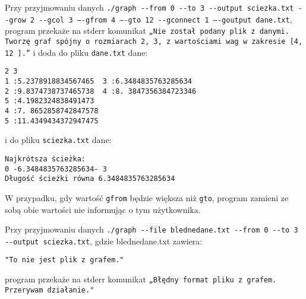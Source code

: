 \documentclass[]{article}
\begin{document}
\bigskip
\bigskip
Przy przyjmowaniu danych \texttt{./graph -{}-from 0 -{}-to 3 -{}-output sciezka.txt -{}-grow 2 -{}-gcol 3 –{}-gfrom 4 –{}-gto 12 -{}-gconnect 1 –{}-goutput dane.txt}, program przekaże na stderr komunikat \texttt{„Nie został podany plik z danymi. Tworzę graf spójny o rozmiarach 2, 3, z wartościami wag w zakresie [4, 12 ].”} i doda do pliku \texttt{dane.txt} dane:
\begin{verbatim}
2 3
1 :5.2378918834567465  3 :6.3484835763285634
2 :9.8374738737465738  4 :8. 3847356384723346
5 :4.1982324838491473
4 :7. 8652858742847578
5 :11.4349434372947475
\end{verbatim}
i do pliku \texttt{sciezka.txt} dane:
\begin{verbatim}
Najkrótsza ścieżka:
0 -6.3484835763285634- 3
Długość ścieżki równa 6.3484835763285634
\end{verbatim}
W przypadku, gdy wartość \texttt{gfrom} będzie większa niż \texttt{gto}, program zamieni ze sobą obie wartości nie informując o tym użytkownika.

\bigskip
\bigskip
Przy przyjmowaniu danych \texttt{./graph -{}-file blednedane.txt -{}-from 0 -{}-to 3 -{}-output  sciezka.txt}, gdzie blednedane.txt zawiera:
\begin{verbatim}
"To nie jest plik z grafem."
\end{verbatim}
program przekaże na stderr komunikat \texttt{„Błędny format pliku z grafem. Przerywam działanie."}
\end{document}
